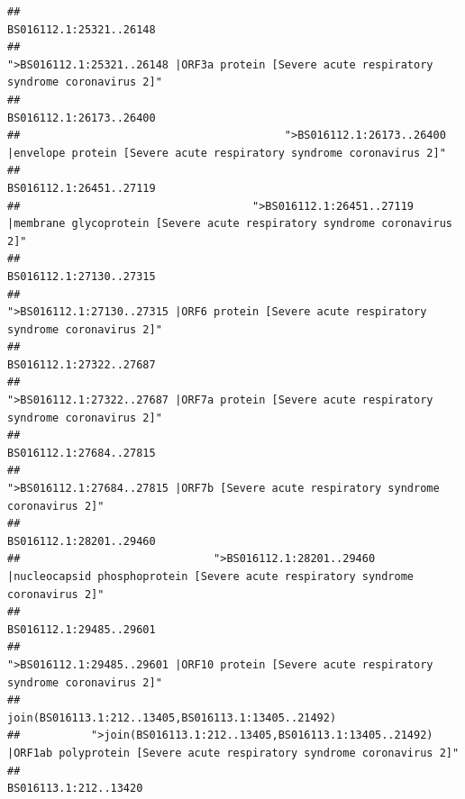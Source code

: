 \documentclass[
]{article}
\begin{document}
\begin{verbatim}
##                                                                                                                BS016112.1:25321..26148 
##                                            ">BS016112.1:25321..26148 |ORF3a protein [Severe acute respiratory syndrome coronavirus 2]" 
##                                                                                                                BS016112.1:26173..26400 
##                                         ">BS016112.1:26173..26400 |envelope protein [Severe acute respiratory syndrome coronavirus 2]" 
##                                                                                                                BS016112.1:26451..27119 
##                                    ">BS016112.1:26451..27119 |membrane glycoprotein [Severe acute respiratory syndrome coronavirus 2]" 
##                                                                                                                BS016112.1:27130..27315 
##                                             ">BS016112.1:27130..27315 |ORF6 protein [Severe acute respiratory syndrome coronavirus 2]" 
##                                                                                                                BS016112.1:27322..27687 
##                                            ">BS016112.1:27322..27687 |ORF7a protein [Severe acute respiratory syndrome coronavirus 2]" 
##                                                                                                                BS016112.1:27684..27815 
##                                                    ">BS016112.1:27684..27815 |ORF7b [Severe acute respiratory syndrome coronavirus 2]" 
##                                                                                                                BS016112.1:28201..29460 
##                              ">BS016112.1:28201..29460 |nucleocapsid phosphoprotein [Severe acute respiratory syndrome coronavirus 2]" 
##                                                                                                                BS016112.1:29485..29601 
##                                            ">BS016112.1:29485..29601 |ORF10 protein [Severe acute respiratory syndrome coronavirus 2]" 
##                                                                                    join(BS016113.1:212..13405,BS016113.1:13405..21492) 
##           ">join(BS016113.1:212..13405,BS016113.1:13405..21492) |ORF1ab polyprotein [Severe acute respiratory syndrome coronavirus 2]" 
##                                                                                                                  BS016113.1:212..13420 

\end{verbatim}
\end{document}
